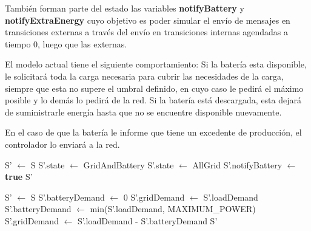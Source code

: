 También forman parte del estado las variables \textbf{notifyBattery} y \textbf{notifyExtraEnergy}
cuyo objetivo es poder simular el envío de mensajes en transiciones externas a través del envío
en transiciones internas agendadas a tiempo 0, luego que las externas.

El modelo actual tiene el siguiente comportamiento: Si la batería esta disponible, le solicitará
toda la carga necesaria para cubrir las necesidades de la carga, siempre que esta no supere
el umbral definido, en cuyo caso le pedirá el máximo posible y lo demás lo pedirá de la red.
Si la batería está descargada, esta dejará de suministrarle energía hasta que no se encuentre
disponible nuevamente.

En el caso de que la batería le informe que tiene un excedente de producción, el controlador
lo enviará a la red.


\begin{algorithm}
    \caption{$updateControllerState(S)$}
    \begin{algorithmic}[H]
        \STATE S' $\leftarrow$ S
            \STATE S'.state $\leftarrow$ GridAndBattery
            \STATE S'.state $\leftarrow$ AllGrid
            \STATE S'.notifyBattery $\leftarrow$ \textbf{true}
        \ENDIF
        \RETURN S'
    \end{algorithmic}
\end{algorithm}

\begin{algorithm}
    \caption{$updateGridConsuption(S)$}
    \begin{algorithmic}[H]
        \STATE S' $\leftarrow$ S
            \STATE S'.batteryDemand $\leftarrow$ 0
            \STATE S'.gridDemand $\leftarrow$ S'.loadDemand
        \ELSE
            \STATE S'.batteryDemand $\leftarrow$ min(S'.loadDemand, MAXIMUM\_POWER)
            \STATE S'.gridDemand $\leftarrow$ S'.loadDemand - S'.batteryDemand
        \ENDIF
        \RETURN S'
    \end{algorithmic}
\end{algorithm}

